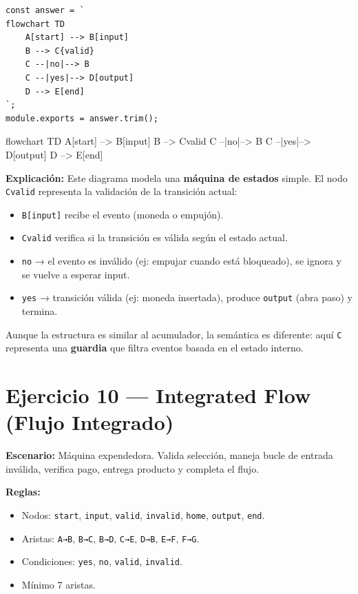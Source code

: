 \documentclass[10pt,a4paper]{article}
\newenvironment{mermaid}[1][]
  {%
   \begin{mdframed}[%
     linecolor=blue!50!black,
     backgroundcolor=blue!3,
     innertopmargin=6pt,
     innerbottommargin=6pt,
     leftmargin=0pt,
     rightmargin=0pt,
     skipabove=10pt,
     skipbelow=10pt,
     frametitle={Diagrama Mermaid},
     frametitlefont={\small\bfseries\color{blue!70!black}},
   ]%
   \small\ttfamily
  }
  {%
   \end{mdframed}%
  }
\begin{document}
\begin{lstlisting}[style=jsstyle]
const answer = `
flowchart TD
    A[start] --> B[input]
    B --> C{valid}
    C --|no|--> B
    C --|yes|--> D[output]
    D --> E[end]
`;
module.exports = answer.trim();
\end{lstlisting}

\begin{mermaid}
flowchart TD
    A[start] --> B[input]
    B --> C{valid}
    C --|no|--> B
    C --|yes|--> D[output]
    D --> E[end]
\end{mermaid}

\textbf{Explicación:}
Este diagrama modela una \textbf{máquina de estados} simple. El nodo
\texttt{C{valid}} representa la validación de la transición actual:
\begin{itemize}
  \item \texttt{B[input]} recibe el evento (moneda o empujón).
  \item \texttt{C{valid}} verifica si la transición es válida según
        el estado actual.
  \item \texttt{no} → el evento es inválido (ej: empujar cuando está
        bloqueado), se ignora y se vuelve a esperar input.
  \item \texttt{yes} → transición válida (ej: moneda insertada),
        produce \texttt{output} (abra paso) y termina.
\end{itemize}

Aunque la estructura es similar al acumulador, la semántica es
diferente: aquí \texttt{C} representa una \textbf{guardia} que filtra
eventos basada en el estado interno.

\newpage

\section{Ejercicio 10 — Integrated Flow (Flujo Integrado)}

\textbf{Escenario:} Máquina expendedora. Valida selección, maneja bucle
de entrada inválida, verifica pago, entrega producto y completa el
flujo.

\textbf{Reglas:}
\begin{itemize}
  \item Nodos: \texttt{start}, \texttt{input}, \texttt{valid},
        \texttt{invalid}, \texttt{home}, \texttt{output}, \texttt{end}.
  \item Aristas: \texttt{A→B}, \texttt{B→C}, \texttt{B→D},
        \texttt{C→E}, \texttt{D→B}, \texttt{E→F}, \texttt{F→G}.
  \item Condiciones: \texttt{yes}, \texttt{no}, \texttt{valid},
        \texttt{invalid}.
  \item Mínimo 7 aristas.
\end{itemize}
\end{document}
